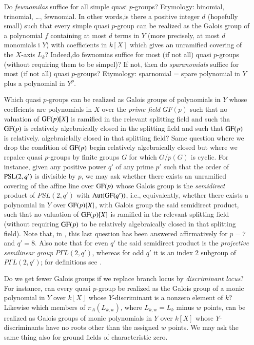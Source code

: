 \begin{question}\label{chap1-qus9.2}
Do \textit{fewnomilas} suffice for all simple quasi $p$-groups? Etymology: binomial, trinomial, \ldots, fewnomial. In other words,is there a positive integer $d$ (hopefully small) such that every simple quasi $p$-group can be realized as the Galois group of a polynomial $f$ containing at most $d$ terms in $Y$ (more precisely, at most $d$ monomials i $Y$)
 with coefficients in $k[X]$ which gives an unramified covering of the $X$-axis $L_{k}$? Indeed,do fewnomias suffice for most (if not all) quasi $p$-groups (without requiring them to be simpel)? If not, then do \textit{sparanomials} suffice for most (if not all) quasi $p$-groups? Etymology: sparnomial = spare polynomial in $Y$ plus a polynomial in $Y^{p}$.
\end{question}

\begin{question}\label{chap1-qus9.3}
Which quasi $p$-groups can be realized as Galois groups of polynomials in $Y$ whose coeffcients are polynomials in $X$ over the \textit{prime field} $GF(p)$ such that no valuation of $\operatorname{GF}(p)[X]$ is ramified in the relevant splitting field and such tha $\operatorname{GF}(p)$ is relatively algebraically closed in the splitting field and such that $\operatorname{GF}(p)$ is relatively. algebraiclally closed in that splitting field? Same question where we drop the condition of $\operatorname{GF}(p)$ begin relatively algebraically closed but where we repalce quasi $p$-groups by finite groups  $G$ for which $G/p(G)$ is cyclic. For instance, given any positive power $q'$ of any prime $p'$ such that the order of $\operatorname{PSL}(2,q')$ is divisible by $p$, we may ask whether there exists an unramified covering of the affine line over $\operatorname{GF}(p)$ whose Galois group is the \textit{semidirect} product of $PSL(2,q')$ with $\operatorname{Aut}(\operatorname{GF}(q'))$, i.e., equivalently, whether there exists a polynomial in $Y$ over $\operatorname{GF}(p)[X]$, with Galois group the said semidirect product, such that no valuation of $\operatorname{GF}(p)[X]$ is ramified in the relevant splitting field (without requiring $\operatorname{GF}(p)$ to be relatively algebraically closed in that splitting field). Note that, in \cite{chap1-key9}, this last question has been answered affirmatively for $p=7$ and $q' =8$. Also note that for even $q'$ the said semidirect product is the \textit{projective semilinear group} $P\Gamma L(2,q')$, whereas for odd $q'$ it is an index 2 subgroup of $P\Gamma L(2,q')$; for definitions see \cite{chap1-key8}.
\end{question}

\begin{question}\label{chap1-qus9.4}
Do we get fewer Galois groups if we replace branch locus by \textit{discriminant locus}? For instance, can every quasi
$p$-group be realized as the Galois group of a monic polynomial in $Y$ over $k[X]$ whose $Y$-discriminant is a nonzero element of $k$? Likewise which members of $\pi_{A}(L_{k,w})$, where $L_{k,w} = L_{k}$ minus $w$ points, can be realized as Galois groups of monic polynomials in $Y$ over $k[X]$ whose $Y$-discriminants have no roots other than the assigned $w$ points. We may ask the same thing also for ground fields of characteristic zero.
\end{question}

